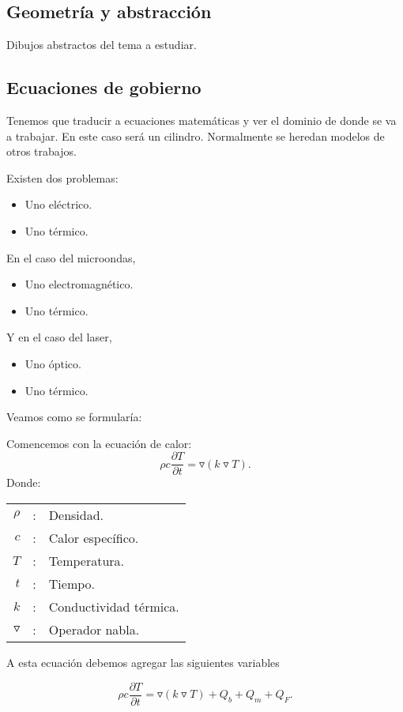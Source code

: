 \subsection{Geometría y abstracción}
Dibujos abstractos del tema a estudiar.

\subsection{Ecuaciones de gobierno}
Tenemos que traducir a ecuaciones matemáticas y ver el dominio de donde se va a trabajar. En este caso será un cilindro. Normalmente se heredan modelos de otros trabajos.

Existen dos problemas:
\begin{itemize}
    \item Uno eléctrico.
    \item Uno térmico.
\end{itemize}

En el caso del microondas, 
\begin{itemize}
	\item Uno electromagnético.
	\item Uno térmico.
\end{itemize}

Y en el caso del laser, 
\begin{itemize}
	\item Uno óptico.
	\item Uno térmico.
\end{itemize}

Veamos como se formularía:

Comencemos con la ecuación de calor:
$$\rho c\dfrac{\partial T}{\partial t}=\triangledown(k\triangledown T).$$
Donde:
\begin{center}
    \begin{tabular}{rcl}
	$\rho$ &:& Densidad.\\ 
	$c$ &:& Calor específico.\\
	$T$ &:& Temperatura.\\
	$t$ &:& Tiempo.\\
	$k$ &:& Conductividad térmica.\\
	$\triangledown$ &:& Operador nabla.
    \end{tabular}
\end{center}

A esta ecuación debemos agregar las siguientes variables

$$\rho c\dfrac{\partial T}{\partial t}=\triangledown(k\triangledown T)+Q_b+Q_m+Q_F.$$

